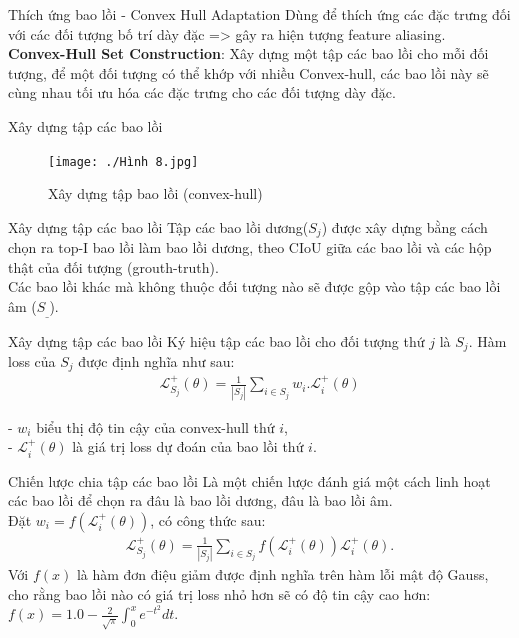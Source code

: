 \documentclass[11pt]{beamer}
\theoremstyle{definition}
\theoremstyle{plain}
\theoremstyle{plain}
\theoremstyle{remark}
\begin{document}
\begin{frame}{Thích ứng bao lồi - Convex Hull Adaptation}
Dùng để thích ứng các đặc trưng đối với các đối tượng bố trí dày đặc => gây ra hiện tượng feature aliasing. \\
\textbf{Convex-Hull Set Construction}: Xây dựng một tập các bao lồi cho mỗi đối tượng,
 để một đối tượng có thể khớp với nhiều Convex-hull, các bao lồi này sẽ cùng nhau tối ưu hóa các đặc trưng cho các đối tượng dày đặc.
\end{frame}

\begin{frame}{Xây dựng tập các bao lồi}
\begin{figure}[ht!]
	\begin{center}
		\texttt{[image: ./Hình 8.jpg]}
		\caption{Xây dựng tập bao lồi (convex-hull)}
		\label{fig_dhandang8 }
	\end{center}
\end{figure}

\end{frame}

\begin{frame}{Xây dựng tập các bao lồi}
	Tập các bao lồi dương($S_j$) được xây dựng bằng cách chọn ra $\text{top-I}$ bao lồi làm bao lồi dương, theo CIoU giữa các bao lồi và các hộp thật của đối tượng (grouth-truth).\\
	 Các bao lồi khác mà không thuộc đối tượng nào sẽ được gộp vào tập các bao lồi âm ($S_{\_}$).
\end{frame}
\begin{frame}{Xây dựng tập các bao lồi}
Ký hiệu tập các bao lồi cho đối tượng thứ $j$ là $S_j$. Hàm loss của $S_j$ được định 
nghĩa như sau:
\begin{align} \label{ptdd5}
	\mathcal{L}_{S_j}^+ (\theta) = \frac{1}{|S_j|} \sum_{i \in {S_j}} w_i .	\mathcal{L}_i^{+}(\theta) 
\end{align}

- $w_i$ biểu thị độ tin cậy của convex-hull thứ $i$, \\
- $\mathcal{L}_i^+(\theta)$ là giá trị loss dự đoán của bao lồi thứ $i$.

\end{frame}

\begin{frame}{Chiến lược chia tập các bao lồi}
Là một chiến lược đánh giá một cách linh hoạt các bao lồi để chọn ra đâu là bao lồi dương, đâu là bao lồi âm.\\
Đặt $w_i = f\left(\mathcal{L}_{i}^{+}({\theta})\right)$, có công thức sau: 
\begin{align} \label{pt11}
	\mathcal{L}_{S_j}^+ (\theta) = \frac{1}{|S_j|} \sum_{i \in {S_j}} f(\mathcal{L}_i^+(\theta)) \mathcal{L}_i^{+}(\theta).
\end{align}
Với $f(x)$ là hàm đơn điệu giảm được định nghĩa trên hàm lỗi mật độ Gauss, cho rằng bao lồi nào có giá trị loss nhỏ hơn sẽ có độ tin cậy cao hơn: $f(x)=1.0-\frac{2}{\sqrt{\pi}} \int_0^x e^{-t^2} d t$.


\end{frame}
\end{document}
